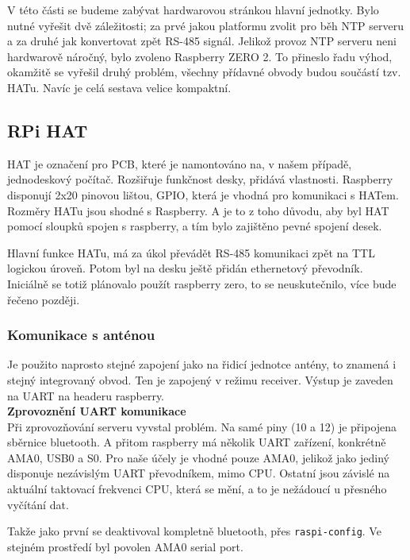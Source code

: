     V této části se budeme zabývat hardwarovou stránkou hlavní jednotky. Bylo nutné
    vyřešit dvě záležitosti; za prvé jakou platformu zvolit pro běh NTP serveru a za druhé
    jak konvertovat zpět RS-485 signál. Jelikož provoz NTP serveru neni hardwarově
    náročný, bylo zvoleno Raspberry ZERO 2. To přineslo řadu výhod, okamžitě se vyřešil
    druhý problém, všechny přídavné obvody budou součástí tzv. HATu. Navíc je celá
    sestava velice kompaktní.
\subsection{RPi HAT}
    HAT je označení pro PCB, které je namontováno na, v našem případě, jednodeskový
    počítač. Rozšiřuje funkčnost desky, přidává vlastnosti. Raspberry disponují
    2x20 pinovou lištou, GPIO, která je vhodná pro komunikaci s HATem. Rozměry HATu jsou
    shodné s Raspberry. A je to z toho důvodu, aby byl HAT pomocí sloupků spojen s
    raspberry, a tím bylo zajištěno pevné spojení desek.

    Hlavní funkce HATu, má za úkol převádět RS-485 komunikaci zpět na TTL
    logickou úroveň. Potom byl na desku ještě přidán ethernetový převodník. Iniciálně
    se totiž plánovalo použít raspberry zero, to se neuskutečnilo, více bude řečeno
    později.
\subsubsection{Komunikace s anténou}

    Je použito naprosto stejné zapojení jako na řidicí jednotce antény, to znamená i
    stejný integrovaný obvod. Ten je zapojený v režimu receiver. Výstup je zaveden na
    UART na headeru raspberry.
\\

\textbf{Zprovoznění UART komunikace}
\\

    Při zprovozňování serveru vyvstal problém. Na samé piny (10 a 12) je připojena
    sběrnice bluetooth. A přitom raspberry má několik UART zařízení, konkrétně AMA0,
    USB0 a S0. Pro naše účely je vhodné pouze AMA0, jelikož jako jediný disponuje
    nezávislým UART převodníkem, mimo CPU. Ostatní jsou závislé na aktuální taktovací
    frekvenci CPU, která se mění, a to je nežádoucí u přesného vyčítání dat.

    Takže jako první se deaktivoval kompletně bluetooth, přes \verb|raspi-config|. Ve
    stejném prostředí byl povolen AMA0 serial port.

